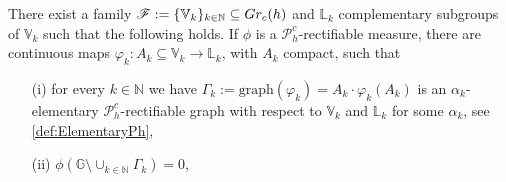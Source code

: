 \documentclass[10pt, a4paper,
oneside, headinclude,footinclude]{scrartcl}
\begin{document}
\begin{proposizione}\label{prop:SplitInElementaryGraph}
There exist a family $\mathscr F:=\{\mathbb V_k\}_{k\in\mathbb N}\subseteq Gr_c(h)$ and $\mathbb L_k$ complementary subgroups of $\mathbb V_k$ such that the following holds. If $\phi$ is a $\mathscr{P}_h^c$-rectifiable measure, there are continuous maps $\varphi_k:A_k\subseteq\mathbb V_k\to\mathbb L_k$, with $A_k$ compact, such that
\begin{itemize}
\item[(i)] for every $k\in\mathbb N$ we have $\Gamma_k:=\mathrm{graph}(\varphi_k)=A_k\cdot\varphi_k(A_k)$ is an $\alpha_k$-elementary  $\mathscr{P}_h^c$-rectifiable graph with respect to $\mathbb V_k$ and $\mathbb L_k$ for some $\alpha_k$, see \cref{def:ElementaryPh},
\item[(ii)] $\phi(\mathbb G\setminus \cup_{k\in\mathbb N}\Gamma_k)=0$,
    
\end{itemize}
\end{proposizione}
\end{document}
